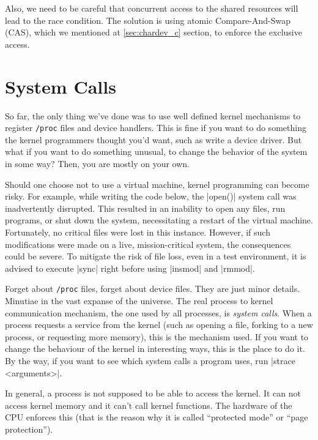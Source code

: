 \documentclass[10pt, oneside]{book}
\begin{document}
Also, we need to be careful that concurrent access to the shared resources will lead to the race condition.
The solution is using atomic Compare-And-Swap (CAS), which we mentioned at \ref{sec:chardev_c} section, to enforce the exclusive access.




\section{System Calls}
\label{sec:syscall}
So far, the only thing we've done was to use well defined kernel mechanisms to register \verb|/proc| files and device handlers.
This is fine if you want to do something the kernel programmers thought you'd want, such as write a device driver.
But what if you want to do something unusual, to change the behavior of the system in some way?
Then, you are mostly on your own.

Should one choose not to use a virtual machine, kernel programming can become risky.
For example, while writing the code below, the \cpp|open()| system call was inadvertently disrupted.
This resulted in an inability to open any files, run programs, or shut down the system, necessitating a restart of the virtual machine.
Fortunately, no critical files were lost in this instance.
However, if such modifications were made on a live, mission-critical system, the consequences could be severe.
To mitigate the risk of file loss, even in a test environment, it is advised to execute \sh|sync| right before using \sh|insmod| and \sh|rmmod|.

Forget about \verb|/proc| files, forget about device files.
They are just minor details.
Minutiae in the vast expanse of the universe.
The real process to kernel communication mechanism, the one used by all processes, is \emph{system calls}.
When a process requests a service from the kernel (such as opening a file, forking to a new process, or requesting more memory), this is the mechanism used.
If you want to change the behaviour of the kernel in interesting ways, this is the place to do it.
By the way, if you want to see which system calls a program uses, run \sh|strace <arguments>|.

In general, a process is not supposed to be able to access the kernel.
It can not access kernel memory and it can't call kernel functions.
The hardware of the CPU enforces this (that is the reason why it is called ``protected mode'' or ``page protection'').
\end{document}
